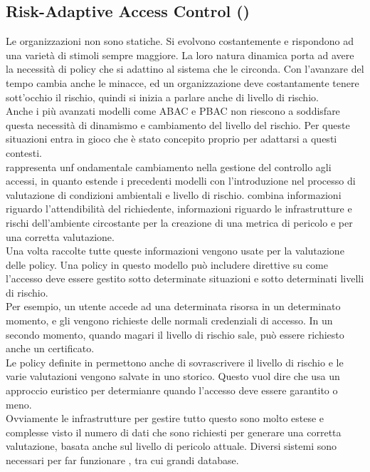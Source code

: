 \subsection{Risk-Adaptive Access Control (\radac)} %
\label{sub:risk_adaptive_access_control_}

Le organizzazioni non sono statiche. Si evolvono costantemente e rispondono ad una varietà di stimoli sempre maggiore. La loro natura dinamica porta ad avere la necessità di policy che si adattino al sistema che le circonda. Con l'avanzare del tempo cambia anche le minacce, ed un organizzazione deve costantamente tenere sott'occhio il rischio, quindi si inizia a parlare anche di livello di rischio.\\
Anche i più avanzati modelli come ABAC e PBAC non riescono a soddisfare questa necessità di dinamismo e cambiamento del livello del rischio. Per queste situazioni entra in gioco \radac che è stato concepito proprio per adattarsi a questi contesti.\\
\radac rappresenta unf ondamentale cambiamento nella gestione del controllo agli accessi, in quanto estende i precedenti modelli con l'introduzione nel processo di valutazione di condizioni ambientali e livello di rischio.
\radac combina informazioni riguardo l'attendibilità del richiedente, informazioni riguardo le infrastrutture e rischi dell'ambiente circostante per la creazione di una metrica di pericolo e per una corretta valutazione.\\
Una volta raccolte tutte queste informazioni vengono usate per la valutazione delle policy. Una policy in questo modello può includere direttive su come l'accesso deve essere gestito sotto determinate situazioni e sotto determinati livelli di rischio.\\
Per esempio, un utente accede ad una determinata risorsa in un determinato momento, e gli vengono richieste delle normali credenziali di accesso. In un secondo momento, quando magari il livello di rischio sale, può essere richiesto anche un certificato.\\
Le policy definite in \radac permettono anche di sovrascrivere il livello di rischio e le varie valutazioni vengono salvate in uno storico.
Questo vuol dire che \radac usa un approccio euristico per determianre quando l'accesso deve essere garantito o meno.\\
Ovviamente le infrastrutture per gestire tutto questo sono molto estese e complesse visto il numero di dati che sono richiesti per generare una corretta valutazione, basata anche sul livello di pericolo attuale. Diversi sistemi sono necessari per far funzionare \radac, tra cui grandi database.\\

